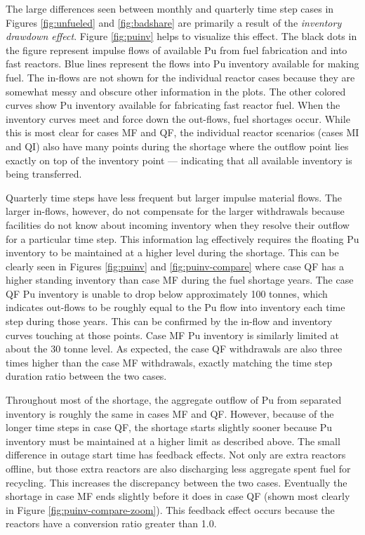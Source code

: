 \documentclass{style}
\begin{document}
The large differences seen between monthly and quarterly time step cases in
Figures \ref{fig:unfueled} and \ref{fig:badshare} are primarily a result of the
\emph{inventory drawdown effect}.  Figure \ref{fig:puinv} helps to visualize
this effect.  The black dots in the figure represent impulse flows of
available Pu from fuel fabrication and into fast reactors.  Blue lines represent
the flows into Pu inventory available for making fuel. The in-flows are not
shown for the individual reactor cases because they are somewhat messy and
obscure other information in the plots. The other colored curves show Pu inventory
available for fabricating fast reactor fuel.  When the inventory curves meet and
force down the out-flows, fuel shortages occur.  While this is most clear for
cases MF and QF, the individual reactor scenarios (cases MI and QI) also have many
points during the shortage where the outflow point lies exactly on top of the
inventory point --- indicating that all available inventory is being
transferred.

Quarterly time steps have less frequent but larger impulse material flows.
The larger in-flows, however, do not compensate for the larger withdrawals
because facilities do not know about incoming inventory when they resolve
their outflow for a particular time step.  This information lag effectively
requires the floating Pu inventory to be maintained at a higher level during
the shortage.  This can be clearly seen in Figures \ref{fig:puinv} and \ref{fig:puinv-compare} where case QF has a higher
standing inventory than case MF during the fuel shortage years.  The case QF Pu
inventory is unable to drop below approximately 100 tonnes, which indicates
out-flows to be roughly equal to the Pu flow into inventory each time step
during those years.  This can be confirmed by the in-flow and inventory curves
touching at those points.  Case MF Pu inventory is similarly limited at about
the 30 tonne level.  As expected, the case QF withdrawals are also three times
higher than the case MF withdrawals, exactly matching the time step duration ratio
between the two cases.

Throughout most of the shortage, the aggregate outflow of Pu from separated
inventory is roughly the same in cases MF and QF.  However, because of the longer
time steps in case QF, the shortage starts slightly sooner because Pu inventory
must be maintained at a higher limit as described above.  The small difference
in outage start time has feedback effects.  Not only are extra reactors
offline, but those extra reactors are also discharging less aggregate spent
fuel for recycling.  This increases the discrepancy between the two
cases. Eventually the shortage in case MF ends slightly before it does in case
QF (shown most clearly in Figure \ref{fig:puinv-compare-zoom}). This feedback effect occurs because the reactors have a
conversion ratio greater than 1.0.
\end{document}
